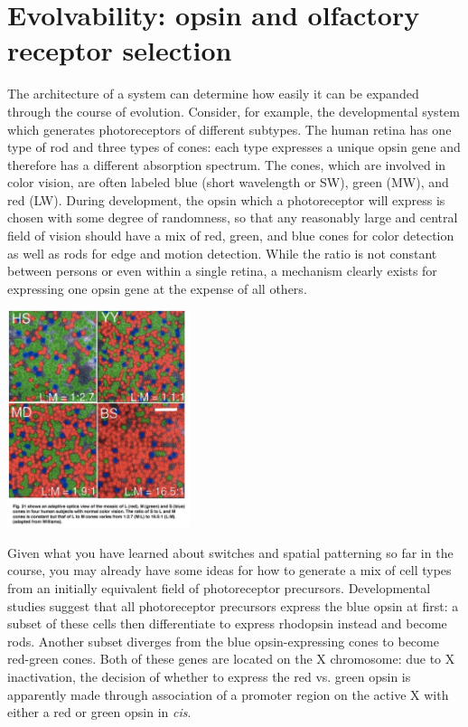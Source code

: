 \documentclass{article}
\begin{document}
\large

\section*{Evolvability: opsin and olfactory receptor selection}

The architecture of a system can determine how easily it can be expanded through the course of evolution. Consider, for example, the developmental system which generates photoreceptors of different subtypes. The human retina has one type of rod and three types of cones: each type expresses a unique opsin gene and therefore has a different absorption spectrum. The cones, which are involved in color vision, are often labeled blue (short wavelength or SW), green (MW), and red (LW). During development, the opsin which a photoreceptor will express is chosen with some degree of randomness, so that any reasonably large and central field of vision should have a mix of red, green, and blue cones for color detection as well as rods for edge and motion detection. While the ratio is not constant between persons or even within a single retina, a mechanism clearly exists for expressing one opsin gene at the expense of all others.
\begin{center}
\includegraphics[width=0.4\textwidth]{distribution.pdf}
\end{center}
Given what you have learned about switches and spatial patterning so far in the course, you may already have some ideas for how to generate a mix of cell types from an initially equivalent field of photoreceptor precursors. Developmental studies suggest that all photoreceptor precursors express the blue opsin at first: a subset of these cells then differentiate to express rhodopsin instead and become rods. Another subset diverges from the blue opsin-expressing cones to become red-green cones. Both of these genes are located on the X chromosome: due to X inactivation, the decision of whether to express the red vs. green opsin is apparently made through association of a promoter region on the active X with either a red or green opsin in \textit{cis}.\\
\end{document}

